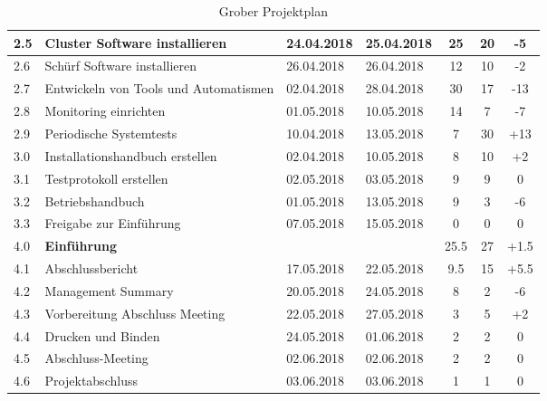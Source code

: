 \begin{table}[H]
\begin{tabular}{|p{0.7cm}p{6.8cm}p{2cm}p{2cm}|c|c|c|}
2.5 & Cluster Software installieren & 24.04.2018 & 25.04.2018 & 25 & 20 & -5 \\\hline
2.6 & Schürf Software installieren & 26.04.2018 & 26.04.2018 & 12 & 10 & -2 \\\hline
2.7 & Entwickeln von Tools und Automatismen & 02.04.2018 & 28.04.2018 & 30 & 17 &  -13 \\\hline
2.8 & Monitoring einrichten & 01.05.2018 & 10.05.2018 & 14 & 7 & -7\\\hline
2.9 & Periodische Systemtests & 10.04.2018 & 13.05.2018 & 7 & 30 & +13\\\hline
3.0 & Installationshandbuch erstellen & 02.04.2018 & 10.05.2018 & 8 & 10 & +2  \\\hline
3.1 & Testprotokoll erstellen & 02.05.2018 & 03.05.2018 & 9 & 9 & 0 \\\hline
3.2 & Betriebshandbuch & 01.05.2018 & 13.05.2018 & 9 & 3 & -6\\\hline
3.3 & Freigabe zur Einführung & 07.05.2018 & 15.05.2018 & 0 & 0 & 0 \\\hline
\rowcolor{subheading} 4.0 & \textbf{Einführung} & & & 25.5 & 27 & +1.5 \\\hline
4.1 & Abschlussbericht & 17.05.2018 & 22.05.2018 & 9.5 & 15 & +5.5 \\\hline
4.2 & Management Summary & 20.05.2018 & 24.05.2018 & 8 & 2 & -6 \\\hline
4.3 & Vorbereitung  Abschluss Meeting & 22.05.2018 & 27.05.2018 & 3 & 5 & +2 \\\hline
4.4 & Drucken und Binden & 24.05.2018 & 01.06.2018 & 2 & 2 & 0 \\\hline
4.5 & Abschluss-Meeting & 02.06.2018 & 02.06.2018 & 2 & 2 & 0 \\\hline
4.6 & Projektabschluss & 03.06.2018 & 03.06.2018 & 1 & 1 & 0 \\\hline
\end{tabular}
\caption{Grober Projektplan}
\end{table}

